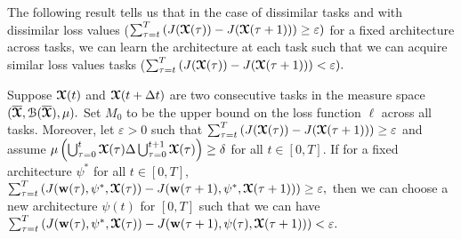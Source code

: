 The following result tells us that in the case of dissimilar tasks and with dissimilar loss values ($\sum_{\tau = t}^{T} \left(J(\boldsymbol{\mathcal{X}}(\tau)) - J(\boldsymbol{\mathcal{X}}(\tau+1))\right)\geq \varepsilon)$ for a fixed architecture across tasks, we can learn the architecture at each task such that we can acquire similar loss values tasks ($\sum_{\tau = t}^{T} \left(J(\boldsymbol{\mathcal{X}}(\tau)) - J(\boldsymbol{\mathcal{X}}(\tau+1))\right) < \varepsilon).$ 
\begin{theorem}\label{thm:intersection}
    Suppose $\boldsymbol{\mathcal{X}}(t)$ and $\boldsymbol{\mathcal{X}}(t+\Delta t)$ are two consecutive tasks in the measure space $(\overline{\boldsymbol{\mathcal{X}}}, \mathcal{B}(\overline{\boldsymbol{\mathcal{X}}}),\mu).$ Set $M_0$ to be the upper bound on the loss function $\ell$ across all tasks. Moreover, let $\varepsilon>0$ such that
    $\sum_{\tau = t}^{T} \left(J(\boldsymbol{\mathcal{X}}(\tau)) - J(\boldsymbol{\mathcal{X}}(\tau+1))\right) \geq \varepsilon$ and assume $\mu\left( \bigcup_{\tau = 0}^{t}\boldsymbol{\mathcal{X}}(\tau)\Delta \bigcup_{\tau = 0}^{t+1}\boldsymbol{\mathcal{X}}(\tau)\right)\geq \delta$ for all $t\in [0,T].$ If for a fixed architecture $\psi^*$ for all $t\in [0,T],$  {\small $\sum_{\tau = t}^{T} \left(J(\boldsymbol{\mathrm{w}}(\tau), \psi^*, \boldsymbol{\mathcal{X}}(\tau)) - J(\boldsymbol{\mathrm{w}}(\tau+1), \psi^*, \boldsymbol{\mathcal{X}}(\tau+1))\right) \geq \varepsilon,$}
    then we can choose a new architecture $\psi(t)$ for $[0,T]$ such that we can have {\small$\sum_{\tau = t}^{T} \left(J(\boldsymbol{\mathrm{w}}(\tau), \psi^*, \boldsymbol{\mathcal{X}}(\tau)) - J(\boldsymbol{\mathrm{w}}(\tau+1), \psi(\tau), \boldsymbol{\mathcal{X}}(\tau+1))\right)  < \varepsilon.$}
\end{theorem}

